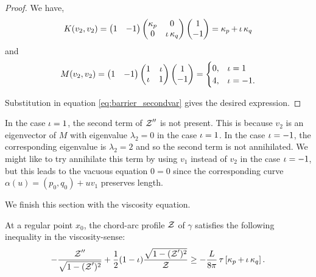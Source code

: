 \documentclass[12pt]{amsart}
\begin{document}
\begin{proof}
We have,
\[
K(v_2, v_2) =
\begin{pmatrix}
1 & -1
\end{pmatrix}
\begin{pmatrix}
\operatorname{\kappa}_{p} & 0 \\
0 & \operatorname{\iota} \operatorname{\kappa}_{q}
\end{pmatrix}
\begin{pmatrix}
1 \\
-1
\end{pmatrix}
= \operatorname{\kappa}_p + \operatorname{\iota} \operatorname{\kappa}_q
\]
and
\[
M(v_2, v_2) = \begin{pmatrix}
1 & -1
\end{pmatrix}
\begin{pmatrix}
1 & \operatorname{\iota} \\
\operatorname{\iota} & 1
\end{pmatrix}
\begin{pmatrix}
1 \\
-1
\end{pmatrix}
= \begin{cases}
0, & \operatorname{\iota} = 1 \\
4, & \operatorname{\iota} = -1.
\end{cases}
\]

Substitution in equation \eqref{eq:barrier_secondvar} gives the desired expression.
\end{proof}

\begin{remark}
In the case \(\operatorname{\iota} = 1\), the second term of \(\operatorname{\mathcal{Z}}''\) is not present. This is because \(v_2\) is an eigenvector of \(M\) with eigenvalue \(\lambda_2 = 0\) in the case \(\operatorname{\iota} = 1\). In the case \(\operatorname{\iota} = -1\), the corresponding eigenvalue is \(\lambda_2 = 2\) and so the second term is not annihilated. We might like to try annihilate this term by using \(v_1\) instead of \(v_2\) in the case \(\operatorname{\iota} = -1\), but this leads to the vacuous equation \(0 = 0\) since the corresponding curve \(\alpha(u) = (p_0, q_0) + u v_1\) preserves length.
\end{remark}

We finish this section with the viscosity equation.

\begin{theorem}
\label{thm:spatial_viscosity}
At a regular point \(x_0\), the chord-arc profile $\operatorname{\mathcal{Z}}$ of \(\gamma\) satisfies the following inequality in the viscosity-sense:
\[
-\frac{\operatorname{\mathcal{Z}}''}{\sqrt{1-(\operatorname{\mathcal{Z}}')^2}} + \frac{1}{2} (1-\operatorname{\iota}) \frac{\sqrt{1 - (\operatorname{\mathcal{Z}}')^2}}{\operatorname{\mathcal{Z}}} \geq -\frac{L}{8\pi} \operatorname{\tau} \left[\operatorname{\kappa}_p + \operatorname{\iota} \operatorname{\kappa}_q\right].
\]
\end{theorem}
\end{document}
